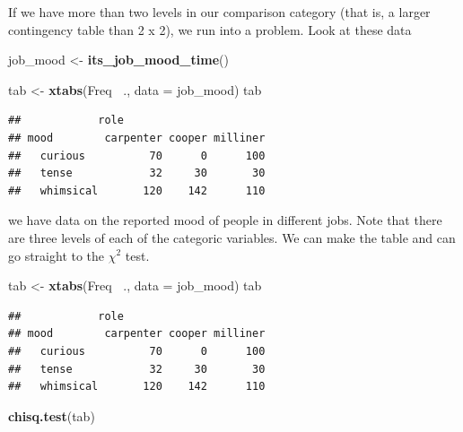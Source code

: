 \documentclass[
]{book}
\newenvironment{Shaded}{\begin{snugshade}}{\end{snugshade}}
\newcommand{\DataTypeTok}[1]{\textcolor[rgb]{0.13,0.29,0.53}{#1}}
\newcommand{\KeywordTok}[1]{\textcolor[rgb]{0.13,0.29,0.53}{\textbf{#1}}}
\newcommand{\NormalTok}[1]{#1}
\newcommand{\OperatorTok}[1]{\textcolor[rgb]{0.81,0.36,0.00}{\textbf{#1}}}
\newcommand{\StringTok}[1]{\textcolor[rgb]{0.31,0.60,0.02}{#1}}
\begin{document}
If we have more than two levels in our comparison category (that is, a larger contingency table than 2 x 2), we run into a problem. Look at these data

\begin{Shaded}
\begin{Highlighting}[]
\NormalTok{job_mood <-}\StringTok{ }\KeywordTok{its_job_mood_time}\NormalTok{()}
\end{Highlighting}
\end{Shaded}

\begin{Shaded}
\begin{Highlighting}[]
\NormalTok{tab <-}\StringTok{ }\KeywordTok{xtabs}\NormalTok{(Freq }\OperatorTok{~}\NormalTok{., }\DataTypeTok{data =}\NormalTok{ job_mood)}
\NormalTok{tab}
\end{Highlighting}
\end{Shaded}

\begin{verbatim}
##            role
## mood        carpenter cooper milliner
##   curious          70      0      100
##   tense            32     30       30
##   whimsical       120    142      110
\end{verbatim}

we have data on the reported mood of people in different jobs. Note that there are three levels of each of the categoric variables. We can make the table and can go straight to the \(\chi^2\) test.

\begin{Shaded}
\begin{Highlighting}[]
\NormalTok{tab <-}\StringTok{ }\KeywordTok{xtabs}\NormalTok{(Freq }\OperatorTok{~}\NormalTok{., }\DataTypeTok{data =}\NormalTok{ job_mood)}
\NormalTok{tab}
\end{Highlighting}
\end{Shaded}

\begin{verbatim}
##            role
## mood        carpenter cooper milliner
##   curious          70      0      100
##   tense            32     30       30
##   whimsical       120    142      110
\end{verbatim}

\begin{Shaded}
\begin{Highlighting}[]
\KeywordTok{chisq.test}\NormalTok{(tab)}
\end{Highlighting}
\end{Shaded}
\end{document}
